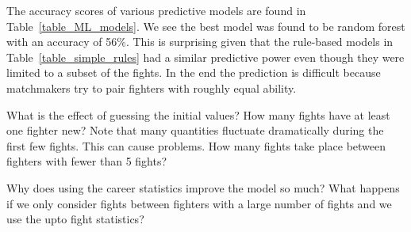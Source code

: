 The accuracy scores of various predictive models are found in Table~\ref{table_ML_models}.
We see the best model was found to be random forest with an accuracy of 56\%. This is
surprising given that the rule-based models in Table~\ref{table_simple_rules} had a
similar predictive power even though they were limited to a subset of the fights.
In the end the prediction is difficult because matchmakers try to pair fighters with
roughly equal ability.

What is the effect of guessing the initial values? How many fights have
at least one fighter new? Note that many quantities fluctuate dramatically
during the first few fights. This can cause problems. How many fights take
place between fighters with fewer than 5 fights?

Why does using the career statistics improve the model so much? What
happens if we only consider fights between fighters with a large number
of fights and we use the upto fight statistics? 



